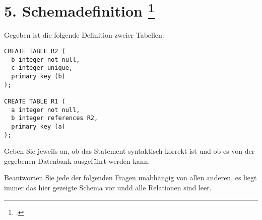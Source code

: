 \documentclass{lehramt-informatik-aufgabe}
\begin{document}
\section{5. Schemadefinition
\footcite{66116:2017:09}}

Gegeben ist die folgende Definition zweier Tabellen:

\begin{verbatim}
CREATE TABLE R2 (
  b integer not null,
  c integer unique,
  primary key (b)
);

CREATE TABLE R1 (
  a integer not null,
  b integer references R2,
  primary key (a)
);
\end{verbatim}

Geben Sie jeweils an, ob das Statement syntaktisch korrekt ist und ob es
von der gegebenen Datenbank ausgeführt werden kann.

Beantworten Sie jede der folgenden Fragen unabhängig von allen anderen,
\dh es liegt immer das hier gezeigte Schema vor undd alle Relationen
sind leer.
\end{document}
